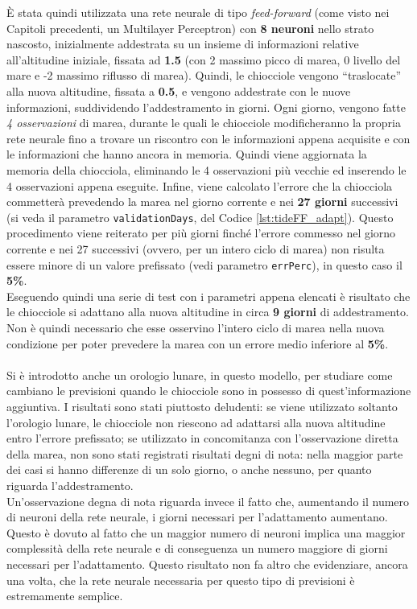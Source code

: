 	È stata quindi utilizzata una rete neurale di tipo \textit{feed-forward} (come visto nei Capitoli precedenti, un Multilayer Perceptron) con \textbf{8 neuroni} nello strato nascosto, inizialmente addestrata su un insieme di informazioni relative all'altitudine iniziale, fissata ad \textbf{1.5} (con 2 massimo picco di marea, 0 livello del mare e -2 massimo riflusso di marea). Quindi, le chiocciole vengono ``traslocate'' alla nuova altitudine, fissata a \textbf{0.5}, e vengono addestrate con le nuove informazioni, suddividendo l'addestramento in giorni. Ogni giorno, vengono fatte \textit{4 osservazioni} di marea, durante le quali le chiocciole modificheranno la propria rete neurale fino a trovare un riscontro con le informazioni appena acquisite e con le informazioni che hanno ancora in memoria. Quindi viene aggiornata la memoria della chiocciola, eliminando le 4 osservazioni più vecchie ed inserendo le 4 osservazioni appena eseguite. Infine, viene calcolato l'errore che la chiocciola commetterà prevedendo la marea nel giorno corrente e nei \textbf{27 giorni} successivi (si veda il parametro \lstinline{validationDays}, del Codice \ref{lst:tideFF_adapt}). Questo procedimento viene reiterato per più giorni finché l'errore commesso nel giorno corrente e nei 27 successivi (ovvero, per un intero ciclo di marea) non risulta essere minore di un valore prefissato (vedi parametro \lstinline{errPerc}), in questo caso il \textbf{5\%}.\\
	Eseguendo quindi una serie di test con i parametri appena elencati è risultato che le chiocciole si adattano alla nuova altitudine in circa \textbf{9 giorni} di addestramento. Non è quindi necessario che esse osservino l'intero ciclo di marea nella nuova condizione per poter prevedere la marea con un errore medio inferiore al \textbf{5\%}.\\
	\\
	Si è introdotto anche un orologio lunare, in questo modello, per studiare come cambiano le previsioni quando le chiocciole sono in possesso di quest'informazione aggiuntiva. I risultati sono stati piuttosto deludenti: se viene utilizzato soltanto l'orologio lunare, le chiocciole non riescono ad adattarsi alla nuova altitudine entro l'errore prefissato; se utilizzato in concomitanza con l'osservazione diretta della marea, non sono stati registrati risultati degni di nota: nella maggior parte dei casi si hanno differenze di un solo giorno, o anche nessuno, per quanto riguarda l'addestramento.\\
	Un'osservazione degna di nota riguarda invece il fatto che, aumentando il numero di neuroni della rete neurale, i giorni necessari per l'adattamento aumentano. Questo è dovuto al fatto che un maggior numero di neuroni implica una maggior complessità della rete neurale e di conseguenza un numero maggiore di giorni necessari per l'adattamento. Questo risultato non fa altro che evidenziare, ancora una volta, che la rete neurale necessaria per questo tipo di previsioni è estremamente semplice.\\
